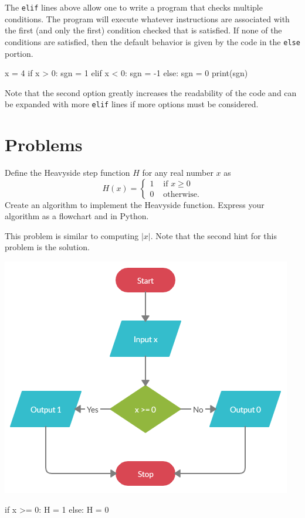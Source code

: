 \documentclass{ximera}
\begin{document}
The \verb|elif| lines above allow one to write a program that checks multiple conditions. The program will execute whatever instructions are associated with the first (and only the first) condition checked that is satisfied. If none of the conditions are satisfied, then the default behavior is given by the code in the \verb|else| portion.

\begin{sageCell}
x = 4
if x > 0:
        sgn = 1
elif x < 0:
        sgn = -1
else:
        sgn = 0
print(sgn)
\end{sageCell}

Note that the second option greatly increases the readability of the code and can be expanded with more \verb|elif| lines if more options must be considered.

\section{Problems}

\begin{question}
Define the Heavyside step function $H$ for any real number $x$ as
	$$H(x)=\begin{cases} 1 &\text{ if $x\geq 0$}\\
		0 &\text{ otherwise.}
	\end{cases}$$
Create an algorithm to implement the Heavyside function. Express your algorithm as a flowchart and in Python.
	\begin{hint}
		This problem is similar to computing $|x|$. Note that the second hint for this problem is the solution.
	\end{hint}
	\begin{hint}
	\begin{center}
		\includegraphics{heavy.png}
	\end{center}
\begin{sageCell}
if x >= 0:
        H = 1
else:
        H = 0
\end{sageCell}
	\end{hint}
\end{question}
\end{document}
